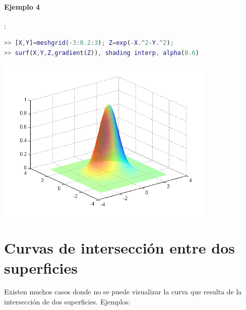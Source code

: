 \paragraph{Ejemplo 4}:
\begin{lstlisting}[language=Matlab]
>> [X,Y]=meshgrid(-3:0.2:3); Z=exp(-X.^2-Y.^2);
>> surf(X,Y,Z,gradient(Z)), shading interp, alpha(0.6)
\end{lstlisting}
\includegraphics[width=300pt]{./Imagenes/3d9.png}

\section{Curvas de intersección entre dos superficies}

Existen muchos casos donde no se puede visualizar la curva que resulta de la intersección de 
dos superficies. Ejemplos:

